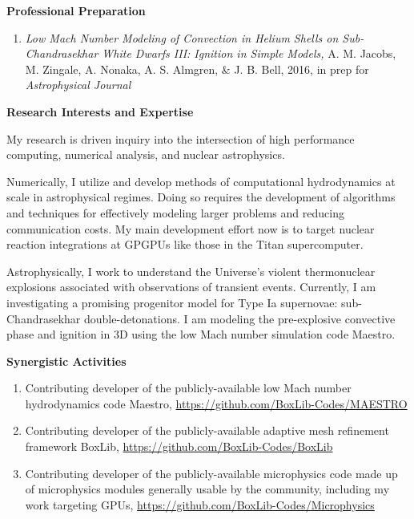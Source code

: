 \documentclass[11pt,letterpaper,english]{article}
\begin{document}
\begin{flushleft} {\bf Professional Preparation}
\begin{enumerate}
\item {\it Low Mach Number Modeling of Convection in Helium Shells on Sub-Chandrasekhar White
   Dwarfs III: Ignition in Simple Models,} A. M. Jacobs, M. Zingale, A. Nonaka, A. S. Almgren,
   & J. B. Bell, 2016, in prep for {\it Astrophysical Journal}

\end{enumerate} 

\vspace{-6pt}
{\bf Research Interests and Expertise}
{\parindent 16pt

  My research is driven inquiry into the intersection of
  high performance computing, numerical analysis, and nuclear astrophysics.  
  
  Numerically, I utilize and develop methods of computational hydrodynamics
  at scale in astrophysical regimes.  Doing so requires the development of algorithms and techniques
  for effectively modeling larger problems and reducing communication costs.
  My main development effort now is to target nuclear reaction integrations at GPGPUs
  like those in the Titan supercomputer.
  
  Astrophysically, I work to understand the Universe's violent thermonuclear
  explosions associated with observations of transient events.  Currently,
  I am investigating a promising progenitor model for Type Ia supernovae:
  sub-Chandrasekhar double-detonations.  I am modeling the pre-explosive
  convective phase and ignition in 3D using the low Mach number simulation
  code Maestro.

}

\vspace{.04in}
{\bf Synergistic Activities}
\vspace{-6pt}
\begin{enumerate} \itemsep1pt \parskip0pt 
\item Contributing developer of the publicly-available low Mach number
  hydrodynamics code Maestro,
  \url{https://github.com/BoxLib-Codes/MAESTRO} \\

\item Contributing developer of the publicly-available adaptive mesh
  refinement framework BoxLib,
  \url{https://github.com/BoxLib-Codes/BoxLib} \\

\item Contributing developer of the publicly-available microphysics code made
  up of microphysics modules generally usable by the community, including my
  work targeting GPUs,
  \url{https://github.com/BoxLib-Codes/Microphysics} \\


\end{enumerate}
\end{flushleft}
\end{document}

